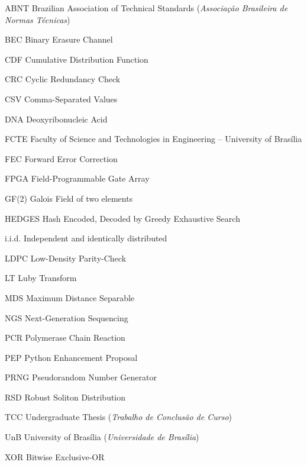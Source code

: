 \begin{siglas}
  \item[ABNT] Brazilian Association of Technical Standards (\emph{Associação Brasileira de Normas Técnicas})
  \item[BEC] Binary Erasure Channel
  \item[CDF] Cumulative Distribution Function
  \item[CRC] Cyclic Redundancy Check
  \item[CSV] Comma-Separated Values
  \item[DNA] Deoxyribonucleic Acid
  \item[FCTE] Faculty of Science and Technologies in Engineering -- University of Brasília
  \item[FEC] Forward Error Correction
  \item[FPGA] Field-Programmable Gate Array
  \item[GF(2)] Galois Field of two elements
  \item[HEDGES] Hash Encoded, Decoded by Greedy Exhaustive Search
  \item[i.i.d.] Independent and identically distributed
  \item[LDPC] Low-Density Parity-Check
  \item[LT] Luby Transform
  \item[MDS] Maximum Distance Separable
  \item[NGS] Next-Generation Sequencing
  \item[PCR] Polymerase Chain Reaction
  \item[PEP] Python Enhancement Proposal
  \item[PRNG] Pseudorandom Number Generator
  \item[RSD] Robust Soliton Distribution
  \item[TCC] Undergraduate Thesis (\emph{Trabalho de Conclusão de Curso})
  \item[UnB] University of Brasília (\emph{Universidade de Brasília})
  \item[XOR] Bitwise Exclusive-OR
\end{siglas}
